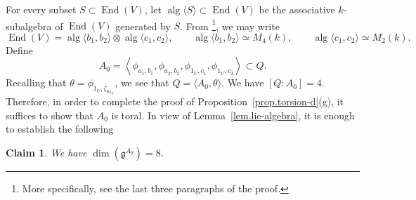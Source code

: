 \documentclass[12pt]{amsart}
\numberwithin{equation}{section}
\newtheorem{claim}[theorem]{Claim}
\theoremstyle{remark}
\newcommand{\alg}{\operatorname{alg}}
\newcommand{\End}{\operatorname{End}}
\begin{document}
For every subset $S\subset \End(V)$, let $\alg\langle S\rangle\subset \End(V)$ be the associative $k$-subalgebra of $\End(V)$ generated by $S$. From \cite[Proof of Theorem 5.2]{draper2017maximal}\footnote{More specifically, see the last three paragraphs of the proof.}, 
we may write
\[
        \End(V)=\alg\langle b_1,b_2\rangle\otimes \alg\langle c_1,c_2\rangle,
        \qquad
        \alg\langle b_1,b_2\rangle\simeq M_4(k),\qquad \alg\langle c_1,c_2\rangle\simeq M_2(k).
\]
Define
\[
        A_0 =
        \left\langle
        \phi_{a_1,b_1},
        \phi_{a_2,b_2},
        \phi_{1_U,c_1},
        \phi_{1_U,c_2}
        \right\rangle
        \subset Q.
\]
Recalling that $\theta=\phi_{1_U,\zeta_81_V}$, we see that $Q=\langle A_0,\theta\rangle$. We have $[Q: A_0]=4$. Therefore, in order to complete the proof
of Proposition~\ref{prop.torsion-d}(g), it suffices to show that $A_0$ is toral. In view of Lemma~\ref{lem.lie-algebra}, it is enough to establish the following

\begin{claim}\label{claim:dim-gB-8}
    We have $\dim(\mathfrak g^{A_0})=8$.
\end{claim} 
\end{document}

